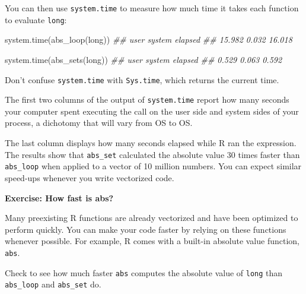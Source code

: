 \documentclass[
  letterpaper,
  DIV=11,
  numbers=noendperiod]{scrbook}
\newenvironment{Shaded}{\begin{snugshade}}{\end{snugshade}}
\newcommand{\DocumentationTok}[1]{\textcolor[rgb]{0.37,0.37,0.37}{\textit{#1}}}
\newcommand{\FunctionTok}[1]{\textcolor[rgb]{0.28,0.35,0.67}{#1}}
\newcommand{\NormalTok}[1]{\textcolor[rgb]{0.00,0.23,0.31}{#1}}
\begin{document}
You can then use \texttt{system.time} to measure how much time it takes
each function to evaluate \texttt{long}:

\begin{Shaded}
\begin{Highlighting}[]
\FunctionTok{system.time}\NormalTok{(}\FunctionTok{abs\_loop}\NormalTok{(long))}
\DocumentationTok{\#\#    user  system elapsed }
\DocumentationTok{\#\#  15.982   0.032  16.018}

\FunctionTok{system.time}\NormalTok{(}\FunctionTok{abs\_sets}\NormalTok{(long))}
\DocumentationTok{\#\#    user  system elapsed }
\DocumentationTok{\#\#   0.529   0.063   0.592}
\end{Highlighting}
\end{Shaded}

\begin{tcolorbox}[enhanced jigsaw, breakable, colback=white, colbacktitle=quarto-callout-important-color!10!white, arc=.35mm, bottomrule=.15mm, coltitle=black, left=2mm, rightrule=.15mm, colframe=quarto-callout-important-color-frame, leftrule=.75mm, opacitybacktitle=0.6, bottomtitle=1mm, toptitle=1mm, titlerule=0mm, opacityback=0, title=\textcolor{quarto-callout-important-color}{\faExclamation}\hspace{0.5em}{Important}, toprule=.15mm]

Don't confuse \texttt{system.time} with \texttt{Sys.time}, which returns
the current time.

\end{tcolorbox}

The first two columns of the output of \texttt{system.time} report how
many seconds your computer spent executing the call on the user side and
system sides of your process, a dichotomy that will vary from OS to OS.

The last column displays how many seconds elapsed while R ran the
expression. The results show that \texttt{abs\_set} calculated the
absolute value 30 times faster than \texttt{abs\_loop} when applied to a
vector of 10 million numbers. You can expect similar speed-ups whenever
you write vectorized code.

\begin{tcolorbox}[enhanced jigsaw, left=2mm, breakable, colback=white, colframe=quarto-callout-color-frame, leftrule=.75mm, bottomrule=.15mm, arc=.35mm, opacityback=0, rightrule=.15mm, toprule=.15mm]

\vspace{-3mm}\textbf{Exercise: How fast is abs?}\vspace{3mm}

Many preexisting R functions are already vectorized and have been
optimized to perform quickly. You can make your code faster by relying
on these functions whenever possible. For example, R comes with a
built-in absolute value function, \texttt{abs}.

Check to see how much faster \texttt{abs} computes the absolute value of
\texttt{long} than \texttt{abs\_loop} and \texttt{abs\_set} do.

\end{tcolorbox}
\end{document}
